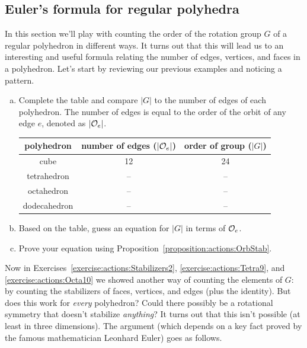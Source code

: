 \subsection{Euler's formula for regular polyhedra}\label{sec:actions:Euler}
In this section we'll play with counting the order of the rotation group $G$ of a regular polyhedron in different ways. It turns out that this will lead us to an interesting and useful formula relating the number of edges, vertices, and faces in a polyhedron.
Let's start by reviewing our previous examples and noticing a pattern.

\begin{exercise}\label{exercise:actions:Eulers1}
\begin{enumerate}[(a)]
\item
Complete the table and compare $|G|$ to the number of edges of each polyhedron.  The number of edges is equal to the order of the orbit of any edge $e$, denoted as $|{\cal O}_e|$.

\begin{tabular}{|c | c | c|}\hline
polyhedron & number of edges ($|{\cal O}_e|$) & order of group ($|G|$)\\ \hline
cube &  12 &   24\\ \hline
tetrahedron &  -- &   --\\ \hline
octahedron & -- &--\\ \hline
dodecahedron &  --&--\\ \hline 
\end{tabular}
\item Based on the table, guess an equation for $|G|$ in terms of ${\cal O}_e$.
\item 
Prove your equation using Proposition~\ref{proposition:actions:OrbStab}.
\end{enumerate}
\end{exercise}
 Now in Exercises~\ref{exercise:actions:Stabilizers2}, \ref{exercise:actions:Tetra9}, and \ref{exercise:actions:Octa10}  we showed another way of counting the elements of $G$: by counting the stabilizers of faces, vertices, and edges (plus the identity). But does this work for \emph{every} polyhedron? Could there possibly be a rotational symmetry that doesn't stabilize \emph{anything}? It turns out that this isn't possible (at least in three dimensions). The argument (which depends on a key fact proved by the famous mathematician Leonhard Euler) goes as follows. 

